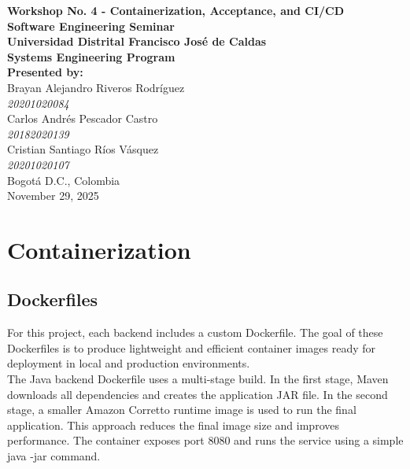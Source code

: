 \documentclass[12pt,a4paper]{article}
\begin{document}
\begin{titlepage}
    \centering
    \vspace*{2cm}
    
    {\Huge \textbf{Workshop No. 4 - Containerization, Acceptance, and CI/CD}}\\[1.2cm]
    {\LARGE \textbf{Software Engineering Seminar}}\\[0.5cm]
    {\Large \textbf{Universidad Distrital Francisco José de Caldas}}\\[0.2cm]
    {\large \textbf{Systems Engineering Program}}\\[2cm]


    {\Large \textbf{Presented by:}}\\[0.5cm]
    {\large Brayan Alejandro Riveros Rodríguez \\ \textit{20201020084}}\\[0.3cm]
    {\large Carlos Andrés Pescador Castro \\ \textit{20182020139}}\\[0.3cm]
    {\large Cristian Santiago Ríos Vásquez \\ \textit{20201020107}}\\[2cm]

    {\Large Bogotá D.C., Colombia}\\[0.3cm]
    {\large November 29, 2025}
    
    \vfill
\end{titlepage}


\section{Containerization}

\subsection{Dockerfiles}
For this project, each backend includes a custom Dockerfile. The goal of these Dockerfiles is to produce lightweight and efficient container images ready for deployment in local and production environments.\\ 

The Java backend Dockerfile uses a multi-stage build. In the first stage, Maven downloads all dependencies and creates the application JAR file. In the second stage, a smaller Amazon Corretto runtime image is used to run the final application. This approach reduces the final image size and improves performance. The container exposes port 8080 and runs the service using a simple java -jar command.\\
\end{document}
